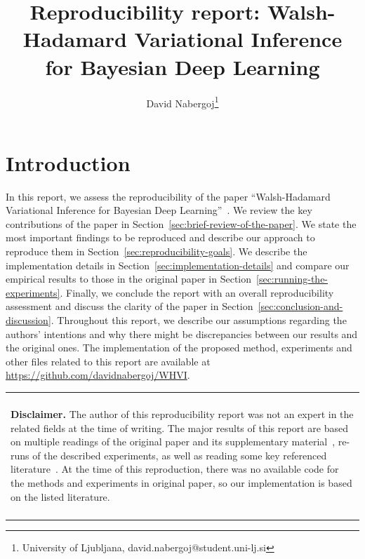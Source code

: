 \documentclass[11pt, twocolumn]{article}
\title{Reproducibility report: Walsh-Hadamard Variational Inference for Bayesian Deep Learning}
\author{David Nabergoj\thanks{University of Ljubljana, david.nabergoj@student.uni-lj.si %
}}
\newenvironment{disclaimer}
    {
    \begin{center}
    \begin{tabular}{|p{0.9\hsize}|}
    \hline\\
    \begin{footnotesize}\textbf{Disclaimer.}}
    {
    \end{footnotesize}
    \\\\\hline
    \end{tabular}
    \end{center}
    }
\begin{document}
    \maketitle


    \section{Introduction}\label{sec:introduction}
    In this report, we assess the reproducibility of the paper ``Walsh-Hadamard Variational Inference for Bayesian Deep Learning''~\cite{rossi2019walsh}.
    We review the key contributions of the paper in Section~\ref{sec:brief-review-of-the-paper}.
    We state the most important findings to be reproduced and describe our approach to reproduce them in Section~\ref{sec:reproducibility-goals}.
    We describe the implementation details in Section~\ref{sec:implementation-details} and compare our empirical results to those in the original paper in Section~\ref{sec:running-the-experiments}.
    Finally, we conclude the report with an overall reproducibility assessment and discuss the clarity of the paper in Section~\ref{sec:conclusion-and-discussion}.
    Throughout this report, we describe our assumptions regarding the authors' intentions and why there might be discrepancies between our results and the original ones.
    The implementation of the proposed method, experiments and other files related to this report are available at \url{https://github.com/davidnabergoj/WHVI}.

    \begin{disclaimer}
    The author of this reproducibility report was not an expert in the related fields at the time of writing.
    The major results of this report are based on multiple readings of the original paper and its supplementary material~\cite{rossi2019walsh}, re-runs of the described experiments, as well as reading some key referenced literature~\cite{le2014fastfood, blundell2015weight, fino1976unified, kingma2015variational, rossi2019good}.
    At the time of this reproduction, there was no available code for the methods and experiments in original paper, so our implementation is based on the listed literature.
    \end{disclaimer}
\end{document}

